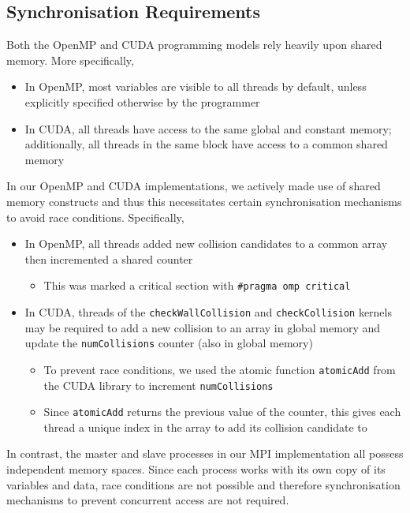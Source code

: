 \documentclass[12pt]{article}
\begin{document}
\subsection{Synchronisation Requirements}
Both the OpenMP and CUDA programming models rely heavily upon shared memory. More specifically,
\begin{itemize}
    \item In OpenMP, most variables are visible to all threads by default, unless explicitly specified otherwise by the programmer
    \item In CUDA, all threads have access to the same global and constant memory; additionally, all threads in the same block have access to a common shared memory
\end{itemize}

In our OpenMP and CUDA implementations, we actively made use of shared memory constructs and thus this necessitates certain synchronisation mechanisms to avoid race conditions. Specifically,
\begin{itemize}
    \item In OpenMP, all threads added new collision candidates to a common array then incremented a shared counter
    \begin{itemize}
        \item This was marked a critical section with \texttt{\#pragma omp critical}
    \end{itemize}
    \item In CUDA, threads of the \texttt{checkWallCollision} and \texttt{checkCollision} kernels may be required to add a new collision to an array in global memory and update the \texttt{numCollisions} counter (also in global memory)
    \begin{itemize}
        \item To prevent race conditions, we used the atomic function \texttt{atomicAdd} from the CUDA library to increment \texttt{numCollisions}
        \item Since \texttt{atomicAdd} returns the previous value of the counter, this gives each thread a unique index in the array to add its collision candidate to
    \end{itemize}
\end{itemize}

\pagebreak

In contrast, the master and slave processes in our MPI implementation all possess independent memory spaces. Since each process works with its own copy of its variables and data, race conditions are not possible and therefore synchronisation mechanisms to prevent concurrent access are not required.\\
\end{document}
